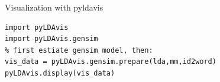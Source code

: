 \documentclass{beamer}
\begin{document}
\begin{frame}[plain]
\end{frame}




\begin{frame}[fragile]{Visualization with pyldavis}
\begin{lstlisting}
import pyLDAvis
import pyLDAvis.gensim
% first estiate gensim model, then:
vis_data = pyLDAvis.gensim.prepare(lda,mm,id2word)
pyLDAvis.display(vis_data)
\end{lstlisting}
\end{frame}
\end{document}
